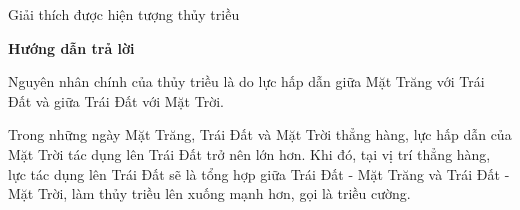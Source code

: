 \begin{dang}{Giải thích được hiện tượng thủy triều}
	{	\begin{center}
			\textbf{Hướng dẫn trả lời}
		\end{center}
		
		Nguyên nhân chính của thủy triều là do lực hấp dẫn giữa Mặt Trăng với Trái Đất và giữa Trái Đất với Mặt Trời.
		
		Trong những ngày Mặt Trăng, Trái Đất và Mặt Trời thẳng hàng, lực hấp dẫn của Mặt Trời tác dụng lên Trái Đất trở nên lớn hơn. Khi đó, tại vị trí thẳng hàng, lực tác dụng lên Trái Đất sẽ là tổng hợp giữa Trái Đất - Mặt Trăng và Trái Đất - Mặt Trời, làm thủy triều lên xuống mạnh hơn, gọi là triều cường.
		
		
	}
\end{dang}
